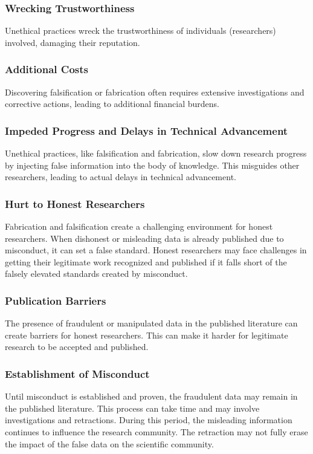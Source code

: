 \documentclass{article}
\begin{document}
	\subsubsection{Wrecking Trustworthiness}
	Unethical practices wreck the trustworthiness of individuals (researchers) involved, damaging their
	reputation.

	\subsubsection{Additional Costs}
	Discovering falsification or fabrication often requires extensive investigations and corrective actions,
	leading to additional financial burdens.

	\subsubsection{Impeded Progress and Delays in Technical Advancement}
	Unethical practices, like falsification and fabrication, slow down research progress by injecting false
	information into the body of knowledge. This misguides other researchers, leading to actual delays in
	technical advancement.

	\subsubsection{Hurt to Honest Researchers}
	Fabrication and falsification create a challenging environment for honest researchers.
	When dishonest or misleading data is already published due to misconduct, it can set a false standard.
	Honest researchers may face challenges in getting their legitimate work recognized and published if it
	falls short of the falsely elevated standards created by misconduct.

	\subsubsection{Publication Barriers}
	The presence of fraudulent or manipulated data in the published literature can create barriers for honest
	researchers.
	This can make it harder for legitimate research to be accepted and published.

	\subsubsection{Establishment of Misconduct}
	Until misconduct is established and proven, the fraudulent data may remain in the published literature.
	This process can take time and may involve investigations and retractions.
	During this period, the misleading information continues to influence the research community.
	The retraction may not fully erase the impact of the false data on the scientific community.
\end{document}
